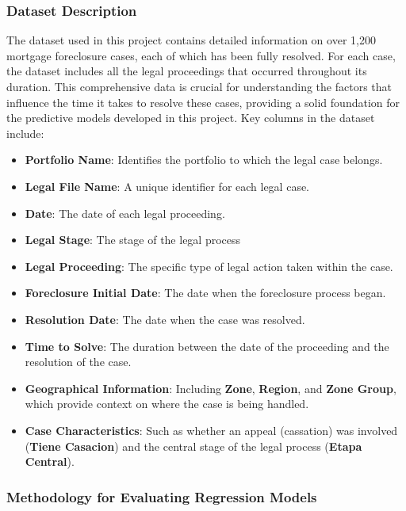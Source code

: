 \documentclass[
  letterpaper,
  DIV=11,
  numbers=noendperiod]{scrartcl}
\begin{document}
\subsubsection{Dataset Description}\label{sec-dataset}

The dataset used in this project contains detailed information on over
1,200 mortgage foreclosure cases, each of which has been fully resolved.
For each case, the dataset includes all the legal proceedings that
occurred throughout its duration. This comprehensive data is crucial for
understanding the factors that influence the time it takes to resolve
these cases, providing a solid foundation for the predictive models
developed in this project. Key columns in the dataset include:

\begin{itemize}
\item
  \textbf{Portfolio Name}: Identifies the portfolio to which the legal
  case belongs.
\item
  \textbf{Legal File Name}: A unique identifier for each legal case.
\item
  \textbf{Date}: The date of each legal proceeding.
\item
  \textbf{Legal Stage}: The stage of the legal process
\item
  \textbf{Legal Proceeding}: The specific type of legal action taken
  within the case.
\item
  \textbf{Foreclosure Initial Date}: The date when the foreclosure
  process began.
\item
  \textbf{Resolution Date}: The date when the case was resolved.
\item
  \textbf{Time to Solve}: The duration between the date of the
  proceeding and the resolution of the case.
\item
  \textbf{Geographical Information}: Including \textbf{Zone},
  \textbf{Region}, and \textbf{Zone Group}, which provide context on
  where the case is being handled.
\item
  \textbf{Case Characteristics}: Such as whether an appeal (cassation)
  was involved (\textbf{Tiene Casacion}) and the central stage of the
  legal process (\textbf{Etapa Central}).
\end{itemize}

\subsubsection{Methodology for Evaluating Regression
Models}\label{sec-methodology}
\end{document}
